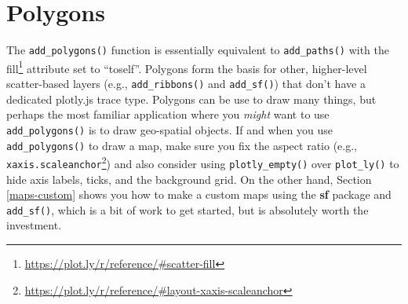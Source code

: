 \documentclass[
  12pt,
]{krantz}
\newenvironment{Shaded}{\begin{snugshade}}{\end{snugshade}}
\newcommand{\DataTypeTok}[1]{\textcolor[rgb]{0.13,0.29,0.53}{#1}}
\newcommand{\FloatTok}[1]{\textcolor[rgb]{0.00,0.00,0.81}{#1}}
\newcommand{\KeywordTok}[1]{\textcolor[rgb]{0.13,0.29,0.53}{\textbf{#1}}}
\newcommand{\NormalTok}[1]{#1}
\newcommand{\OperatorTok}[1]{\textcolor[rgb]{0.81,0.36,0.00}{\textbf{#1}}}
\newcommand{\OtherTok}[1]{\textcolor[rgb]{0.56,0.35,0.01}{#1}}
\newcommand{\StringTok}[1]{\textcolor[rgb]{0.31,0.60,0.02}{#1}}
\renewcommand{\href}[2]{#2\footnote{\url{#1}}}
\begin{document}
\hypertarget{polygons}{%
\section{Polygons}\label{polygons}}


The \texttt{add\_polygons()} function is essentially equivalent to \texttt{add\_paths()} with the \href{https://plot.ly/r/reference/\#scatter-fill}{fill} attribute set to ``toself''. Polygons form the basis for other, higher-level scatter-based layers (e.g., \texttt{add\_ribbons()} and \texttt{add\_sf()}) that don't have a dedicated plotly.js trace type. Polygons can be use to draw many things, but perhaps the most familiar application where you \emph{might} want to use \texttt{add\_polygons()} is to draw geo-spatial objects. If and when you use \texttt{add\_polygons()} to draw a map, make sure you fix the aspect ratio (e.g., \href{https://plot.ly/r/reference/\#layout-xaxis-scaleanchor}{\texttt{xaxis.scaleanchor}}) and also consider using \texttt{plotly\_empty()} over \texttt{plot\_ly()} to hide axis labels, ticks, and the background grid. On the other hand, Section \ref{maps-custom} shows you how to make a custom maps using the \textbf{sf} package and \texttt{add\_sf()}, which is a bit of work to get started, but is absolutely worth the investment.

\begin{Shaded}
\end{Shaded}
\end{document}

